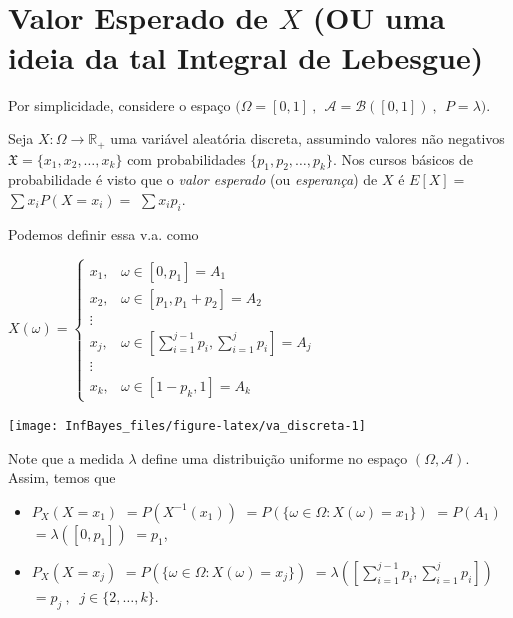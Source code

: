 \documentclass[
]{book}
\begin{document}
\(~\)

\(~\)

\hypertarget{lebesgue}{%
\section{\texorpdfstring{Valor Esperado de \(X\) (OU uma ideia da tal Integral de Lebesgue)}{Valor Esperado de X (OU uma ideia da tal Integral de Lebesgue)}}\label{lebesgue}}

Por simplicidade, considere o espaço \(\Big(\Omega = [0,1]~,~~ \mathcal{A} = \mathcal{B}\left([0,1]\right)~,~~ P=\lambda\Big)\).

Seja \(X: \Omega \longrightarrow \mathbb{R}_+\) uma variável aleatória discreta, assumindo valores não negativos \(\mathfrak{X}=\{x_1,x_2,\ldots,x_k\}\) com probabilidades \(\{p_1,p_2,\ldots,p_k\}\). Nos cursos básicos de probabilidade é visto que o \emph{valor esperado} (ou \emph{esperança}) de \(X\) é \(E[X] =\) \(\sum x_i P(X=x_i) =\) \(\sum x_i p_i\).

Podemos definir essa v.a. como

\(X(\omega) = \left\{\begin{array}{ll} x_1, & \omega \in [0,p_1] = A_1 \\  x_2, & \omega \in [p_1,p_1+p_2] = A_2 \\  \vdots & \\  x_j, & \omega \in \left[\displaystyle\sum_{i=1}^{j-1} p_i,\sum_{i=1}^{j} p_i\right] = A_j \\  \vdots & \\  x_k, & \omega \in [1-p_k,1] = A_k \end{array}\right.\)

\begin{center}\texttt{[image: InfBayes\_files/figure-latex/va\_discreta-1]} \end{center}

Note que a medida \(\lambda\) define uma distribuição uniforme no espaço \((\Omega,\mathcal{A})\). Assim, temos que

\begin{itemize}
\item
  \(P_X(X=x_1)\) \(=P\left(X^{-1}(x_1)\right)\) \(=P\left(\{\omega \in \Omega : X(\omega)=x_1\}\right)\) \(=P(A_1)\) \(=\lambda\left([0,p_1]\right)\) \(=p_1\),
\item
  \(P_X(X=x_j)\) \(=P\left(\{\omega \in \Omega : X(\omega)=x_j\}\right)\) \(=\lambda\left(\left[\sum_{i=1}^{j-1} p_i,\sum_{i=1}^{j} p_i\right]\right)\) \(=p_j ~,~\) \(j \in \{2,\ldots,k\}\).
\end{itemize}
\end{document}

